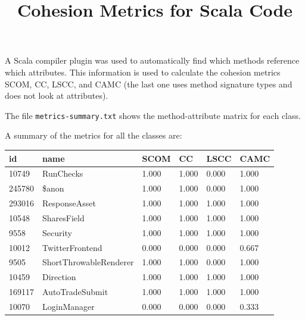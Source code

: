 \documentclass[a4paper]{article}
\title{\phantomsection%
  Cohesion Metrics for Scala Code%
  \label{cohesion-metrics-for-scala-code}}
\author{}
\date{}
\newlength{\DUtablewidth} %
\begin{document}
\maketitle

A Scala compiler plugin was used to automatically find which methods reference
which attributes. This information is used to calculate the cohesion metrics
SCOM, CC, LSCC, and CAMC (the last one uses method signature types and does not
look at attributes).

The file \texttt{metrics-summary.txt} shows the method-attribute matrix for each
class.

A summary of the metrics for all the classes are:

\setlength{\DUtablewidth}{\linewidth}
\begin{longtable*}[c]{|p{0.160\DUtablewidth}|p{0.160\DUtablewidth}|p{0.160\DUtablewidth}|p{0.160\DUtablewidth}|p{0.160\DUtablewidth}|p{0.160\DUtablewidth}|}
\hline

id
 & 
name
 & 
SCOM
 & 
CC
 & 
LSCC
 & 
CAMC
 \\
\hline

10749
 & 
RunChecks
 & 
1.000
 & 
1.000
 & 
0.000
 & 
1.000
 \\
\hline

245780
 & 
\$anon
 & 
1.000
 & 
1.000
 & 
0.000
 & 
1.000
 \\
\hline

293016
 & 
ResponseAsset
 & 
1.000
 & 
1.000
 & 
1.000
 & 
1.000
 \\
\hline

10548
 & 
SharesField
 & 
1.000
 & 
1.000
 & 
1.000
 & 
1.000
 \\
\hline

9558
 & 
Security
 & 
1.000
 & 
1.000
 & 
1.000
 & 
1.000
 \\
\hline

10012
 & 
TwitterFrontend
 & 
0.000
 & 
0.000
 & 
0.000
 & 
0.667
 \\
\hline

9505
 & 
ShortThrowableRenderer
 & 
1.000
 & 
1.000
 & 
0.000
 & 
1.000
 \\
\hline

10459
 & 
Direction
 & 
1.000
 & 
1.000
 & 
1.000
 & 
1.000
 \\
\hline

169117
 & 
AutoTradeSubmit
 & 
1.000
 & 
1.000
 & 
1.000
 & 
1.000
 \\
\hline

10070
 & 
LoginManager
 & 
0.000
 & 
0.000
 & 
0.000
 & 
0.333
 \\
\hline


\end{longtable*}
\end{document}
